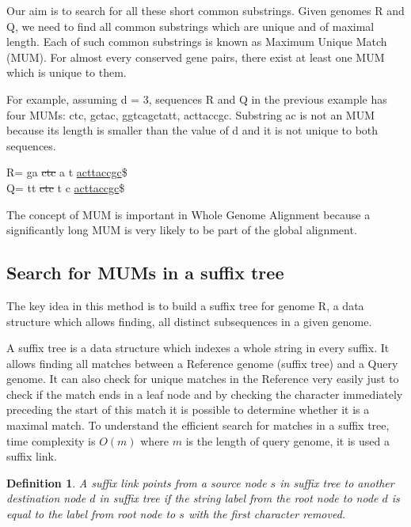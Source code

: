 \documentclass[conference]{IEEEtran}
\newtheorem{mydef}{Definition}
\begin{document}
Our aim is to search for all these short common substrings. Given genomes R and Q, we need to find all common substrings which are unique and of maximal length. Each of such common substrings is known as Maximum Unique Match (MUM). For almost every conserved gene pairs, there exist at least one MUM which is unique to them.

For example, assuming d = 3, sequences R and Q in the previous example has four MUMs: ctc, gctac, ggtcagctatt, acttaccgc. Substring ac is not an MUM because its length is smaller than the value of d and it is not unique to both sequences.

\begin{center}
    R= ga \sout{ctc} a  t  \uline{acttaccgc}\$\\
    Q= tt \sout{ctc} t   c \uline{acttaccgc}\$\\
\end{center}

The concept of MUM is important in Whole Genome Alignment because a significantly long MUM is very likely to be part of the global alignment.
\subsection{Search for MUMs in a suffix tree} 
The key idea in this method is to build a suffix tree for genome R, a data structure which allows finding, all distinct subsequences in a given genome.

A suffix tree is a data structure which indexes a whole string in every suffix. It allows finding all matches between a Reference genome (suffix tree) and a Query genome. It can also check for unique matches in the Reference very easily just to check if the match ends in a leaf node and by checking the character immediately preceding the start of this match it is possible to determine whether it is a maximal match. To understand the efficient search for matches in a suffix tree, time complexity is $O(m)$ where $m$ is the length of query genome, it is used a suffix link. 

\begin{mydef}
A suffix link points from a source node $s$ in suffix tree to another destination node $d$ in suffix tree if the string label from the root node to node $d$ is equal to the label from root node to $s$ with the first character removed.
\end{mydef}
\end{document}
